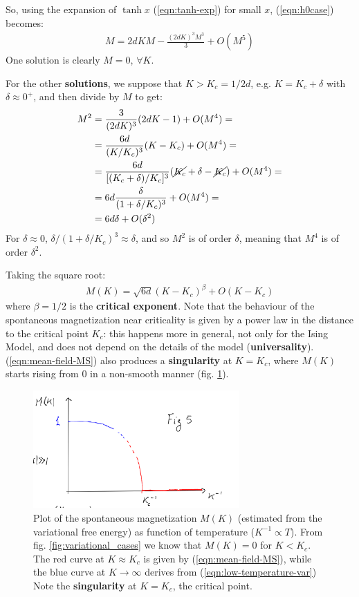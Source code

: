 \documentclass[../../main.tex]{subfiles}
\begin{document}
\medskip

So, using the expansion of $\tanh x$ (\ref{eqn:tanh-exp}) for small $x$, (\ref{eqn:h0case}) becomes:
\begin{align*}
    M = 2dKM- \frac{(2dK)^3 M^3}{3} + O(M^5) 
\end{align*}
One solution is clearly $M=0$, $\forall K$. 

For the other \textbf{solutions}, we suppose that $K > K_c = 1/2d$, e.g. $K = K_c + \delta$ with $\delta \approx 0^+$, and then divide by $M$ to get:
\begin{align*}
    M^2 &= \frac{3}{(2dK)^3}(2dK-1) + O(M^4) =\\
        &= \frac{6d}{(K/K_c)^3} (K-K_c)  + O(M^4) =\\
        &= \frac{6d}{[(K_c + \delta)/K_c]^3} (\cancel{K_c}+\delta - \cancel{K_c}) + O(M^4) =\\
        &= 6d \frac{\delta}{(1+ \delta/K_c)^3} + O(M^4) =\\
        &= 6d \delta + O(\delta^2)
\end{align*}
For $\delta \approx 0$, $\delta/(1+ \delta/K_c)^3 \approx \delta$, and so $M^2$ is of order $\delta$, meaning that $M^4$ is of order $\delta^2$. 

Taking the square root:
\begin{align}\label{eqn:mean-field-MS}
    M(K) = \sqrt{6d} (K-K_c)^\beta + O(K-K_c)
\end{align}
where $\beta = 1/2$ is the \textbf{critical exponent}. Note that the behaviour of the spontaneous magnetization near criticality is given by a power law in the distance to the critical point $K_c$: this happens more in general, not only for the Ising Model, and does not depend on the details of the model  (\textbf{universality}). (\ref{eqn:mean-field-MS}) also produces a \textbf{singularity} at $K=K_c$, where $M(K)$ starts rising from $0$ in a non-smooth manner (fig. \ref{fig:MK_plot}).

\begin{figure}[H]
    \centering
    \includegraphics[width=0.7\textwidth]{MK_plot.png}
    \caption{Plot of the spontaneous magnetization $M(K)$ (estimated from the variational free energy) as function of temperature ($K^{-1} \propto T$).
    From fig. \ref{fig:variational_cases} we know that $M(K) = 0$ for $K < K_c$. The red curve at $K \approx K_c$ is given by (\ref{eqn:mean-field-MS}), while the blue curve at $K \to \infty$ derives from (\ref{eqn:low-temperature-var})
    Note the \textbf{singularity} at $K=K_c$, the critical point. }
    \label{fig:MK_plot}
\end{figure}
\end{document}
